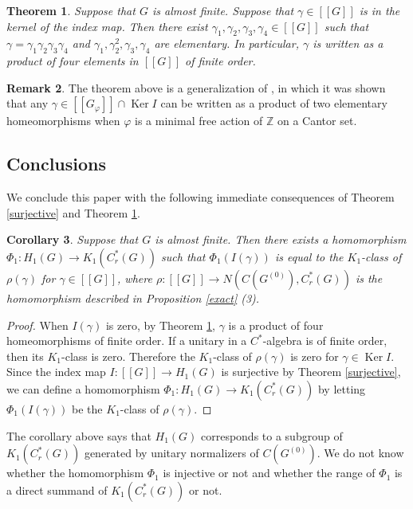 \documentclass[11pt]{article}
\newtheorem{thm}{Theorem}[section]
\newtheorem{cor}[thm]{Corollary}
\theoremstyle{definition}
\newtheorem{rem}[thm]{Remark}
\renewcommand{\phi}{\varphi}
\renewcommand{\ker}{\operatorname{Ker}}
\newcommand{\Z}{\mathbb{Z}}
\begin{document}
\begin{thm}\label{injective}
Suppose that $G$ is almost finite. 
Suppose that $\gamma\in[[G]]$ is in the kernel of the index map. 
Then there exist $\gamma_1,\gamma_2,\gamma_3,\gamma_4\in[[G]]$ such that 
$\gamma=\gamma_1\gamma_2\gamma_3\gamma_4$ and 
$\gamma_1,\gamma_2^2,\gamma_3,\gamma_4$ are elementary. 
In particular, 
$\gamma$ is written as a product of four elements in $[[G]]$ of finite order. 
\end{thm}

\begin{rem}
The theorem above is a generalization of \cite[Lemma 4.1]{Msrtfg}, 
in which it was shown that 
any $\gamma\in[[G_\phi]]\cap\ker I$ can be written as a product of 
two elementary homeomorphisms 
when $\phi$ is a minimal free action of $\Z$ on a Cantor set. 
\end{rem}


\subsection{Conclusions}

We conclude this paper with the following immediate consequences of 
Theorem \ref{surjective} and Theorem \ref{injective}. 

\begin{cor}\label{Phi1}
Suppose that $G$ is almost finite. 
Then there exists a homomorphism $\Phi_1:H_1(G)\to K_1(C^*_r(G))$ 
such that $\Phi_1(I(\gamma))$ is equal to the $K_1$-class of $\rho(\gamma)$ 
for $\gamma\in[[G]]$, 
where $\rho:[[G]]\to N(C(G^{(0)}),C^*_r(G))$ is the homomorphism 
described in Proposition \ref{exact} (3). 
\end{cor}
\begin{proof}
When $I(\gamma)$ is zero, by Theorem \ref{injective}, 
$\gamma$ is a product of four homeomorphisms of finite order. 
If a unitary in a $C^*$-algebra is of finite order, then 
its $K_1$-class is zero. 
Therefore the $K_1$-class of $\rho(\gamma)$ is zero for $\gamma\in\ker I$. 
Since the index map $I:[[G]]\to H_1(G)$ is surjective 
by Theorem \ref{surjective}, 
we can define a homomorphism $\Phi_1:H_1(G)\to K_1(C^*_r(G))$ 
by letting $\Phi_1(I(\gamma))$ be the $K_1$-class of $\rho(\gamma)$. 
\end{proof}

The corollary above says that 
$H_1(G)$ corresponds to a subgroup of $K_1(C^*_r(G))$ 
generated by unitary normalizers of $C(G^{(0)})$. 
We do not know whether the homomorphism $\Phi_1$ is injective or not and 
whether the range of $\Phi_1$ is a direct summand of $K_1(C^*_r(G))$ or not. 
\end{document}
